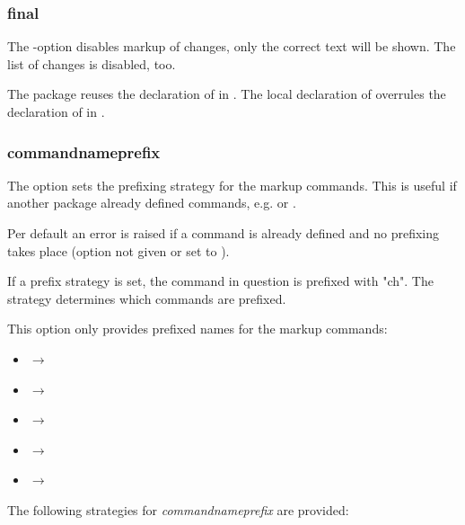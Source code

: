 \subsubsection{final}


The -option disables markup of changes, only the correct text will be shown.
The list of changes is disabled, too.

The  package reuses the declaration of  in .
The local declaration of  overrules the declaration of  in .


\subsubsection{commandnameprefix}
\label{sec:ui:options:commandnameprefix}


The  option sets the prefixing strategy for the markup commands.
This is useful if another package already defined commands, e.g.  or .

Per default an error is raised if a command is already defined and no prefixing takes place (option not given or set to ).

If a prefix strategy is set, the command in question is prefixed with "ch".
The strategy determines which commands are prefixed.

This option only provides prefixed names for the markup commands:

\begin{itemize}
	\item {} \ensuremath{\to} 
	\item {} \ensuremath{\to} 
	\item {} \ensuremath{\to} 
	\item {} \ensuremath{\to} 
	\item {} \ensuremath{\to} 
\end{itemize}

The following strategies for \emph{commandnameprefix} are provided:

